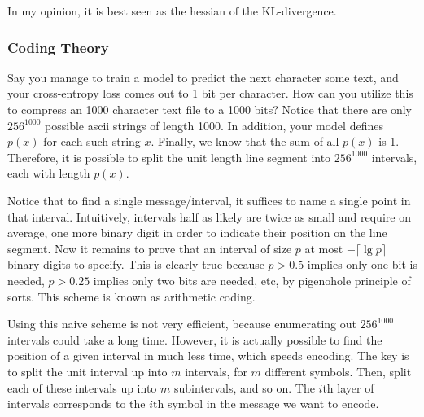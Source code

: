 \documentclass[12pt]{article}
\begin{document}
In my opinion, it is best seen as the hessian of the KL-divergence.


\subsubsection{Coding Theory}

Say you manage to train a model to predict the next character some text, and your cross-entropy loss comes out to 1 bit per character. How can you utilize this to compress an 1000 character text file to a 1000 bits? Notice that there are only $256^{1000}$ possible ascii strings of length 1000. In addition, your model defines $p(x)$ for each such string $x$. Finally, we know that the sum of all $p(x)$ is 1. Therefore, it is possible to split the unit length line segment into $256^{1000}$ intervals, each with length $p(x)$.

Notice that to find a single message/interval, it suffices to name a single point in that interval. Intuitively, intervals half as likely are twice as small and require on average, one more binary digit in order to indicate their position on the line segment. Now it remains to prove that an interval of size $p$ at most $- \lceil \lg p \rceil$ binary digits to specify. This is clearly true because $p > 0.5$ implies only one bit is needed, $p > 0.25$ implies only two bits are needed, etc, by pigenohole principle of sorts. This scheme is known as arithmetic coding.

Using this naive scheme is not very efficient, because enumerating out $256^{1000}$ intervals could take a long time. However, it is actually possible to find the position of a given interval in much less time, which speeds encoding. The key is to split the unit interval up into $m$ intervals, for $m$ different symbols. Then, split each of these intervals up into $m$ subintervals, and so on. The $i$th layer of intervals corresponds to the $i$th symbol in the message we want to encode.
\end{document}
